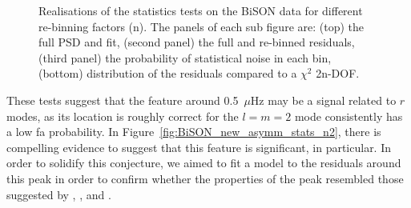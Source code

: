 \begin{figure}[!ht]
	\qquad
	
	\caption{Realisations of the statistics tests on the BiSON data for different re-binning factors (n). The panels of each sub figure are: (top) the full PSD and fit, (second panel) the full and re-binned residuals, (third panel) the probability of statistical noise in each bin, (bottom) distribution of the residuals compared to a $\chi^2$ 2n-DOF.}
	\label{fig:BiSON_new_asymm_stats}
\end{figure}


These tests suggest that the feature around 0.5~$\mu$Hz may be a signal related to $r$ modes, as its location is roughly correct for the $l=m=2$ mode consistently has a low \gls{fa} probability. %
In Figure~\ref{fig:BiSON_new_asymm_stats_n2}, there is compelling evidence to suggest that this feature is significant, in particular. In order to solidify this conjecture, we aimed to fit a model to the residuals around this peak in order to confirm whether the properties of the peak resembled those suggested by \citet{loptien_global-scale_2018}, \citet{liang_time-distance_2019}, and \citet{lanza_sectoral_2019}.


